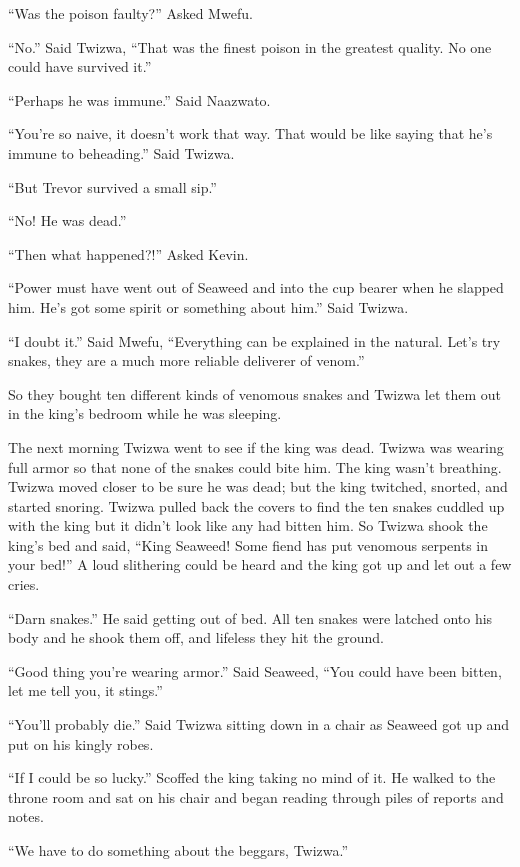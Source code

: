 ``Was the poison faulty?'' Asked Mwe\-fu.

``No.'' Said Twi\-zwa, ``That was the finest poison in the greatest quality. No one could have survived it.'' 

``Perhaps he was immune.'' Said Naa\-zwa\-to.

``You're so naive, it doesn't work that way. That would be like saying that he's immune to beheading.'' Said Twi\-zwa.

``But Trevor survived a small sip.''

``No! He was dead.''

``Then what happened?!'' Asked Kevin.

``Power must have went out of Seaweed and into the cup bearer when he slapped him. He's got some spirit or something about him.'' Said Twi\-zwa.

``I doubt it.'' Said Mwe\-fu, ``Everything can be explained in the natural. Let's try snakes, they are a much more reliable deliverer of venom.''

So they bought ten different kinds of venomous snakes and Twi\-zwa let them out in the king's bedroom while he was sleeping.

The next morning Twi\-zwa went to see if the king was dead.
Twi\-zwa was wearing full armor so that none of the snakes could bite him.
The king wasn't breathing.
Twi\-zwa moved closer to be sure he was dead; but the king twitched, snorted, and started snoring.
Twi\-zwa pulled back the covers to find the ten snakes cuddled up with the king but it didn't look like any had bitten him.
So Twi\-zwa shook the king's bed and said,
``King Seaweed! Some fiend has put venomous serpents in your bed!'' A loud slithering could be heard and the king got up and let out a few cries.

``Darn snakes.'' He said getting out of bed.
All ten snakes were latched onto his body and he shook them off, and lifeless they hit the ground.

``Good thing you're wearing armor.'' Said Seaweed, ``You could have been bitten, let me tell you, it stings.''

``You'll probably die.'' Said Twi\-zwa sitting down in a chair as Seaweed got up and put on his kingly robes.

``If I could be so lucky.'' Scoffed the king taking no mind of it. He walked to the throne room and sat on his chair and began reading through piles of reports and notes.

``We have to do something about the beggars, Twi\-zwa.''

